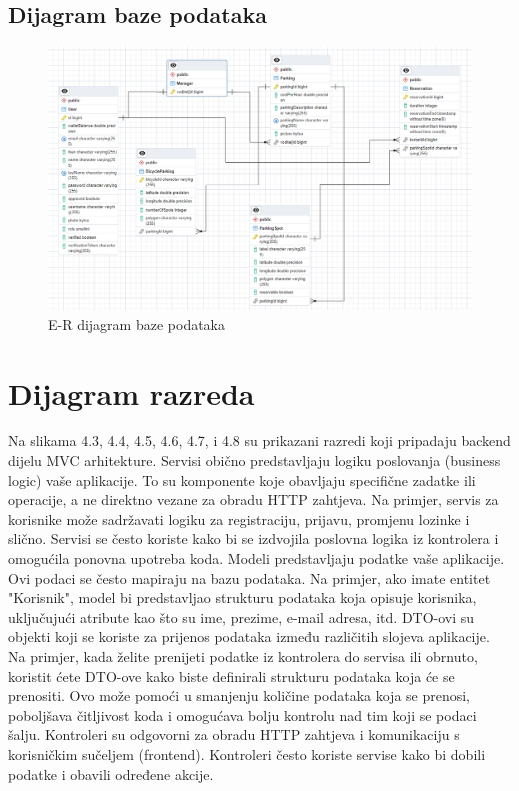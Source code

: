 \subsection{Dijagram baze podataka}


\begin{figure}[H]
	\includegraphics[width=\textwidth]{slike/baza_podataka.png} %
	\centering
	\caption{E-R dijagram baze podataka}
\end{figure}








\eject


\section{Dijagram razreda}

Na slikama 4.3, 4.4, 4.5, 4.6, 4.7, i 4.8 su prikazani razredi koji pripadaju backend dijelu MVC
arhitekture.
Servisi obično predstavljaju logiku poslovanja (business logic) vaše aplikacije. To su komponente koje obavljaju specifične zadatke ili operacije, a ne direktno vezane za obradu HTTP zahtjeva. Na primjer, servis za korisnike može sadržavati logiku za registraciju, prijavu, promjenu lozinke i slično. Servisi se često koriste kako bi se izdvojila poslovna logika iz kontrolera i omogućila ponovna upotreba koda.
Modeli predstavljaju podatke vaše aplikacije. Ovi podaci se često mapiraju na bazu podataka. Na primjer, ako imate entitet "Korisnik", model bi predstavljao strukturu podataka koja opisuje korisnika, uključujući atribute kao što su ime, prezime, e-mail adresa, itd.
DTO-ovi su objekti koji se koriste za prijenos podataka između različitih slojeva aplikacije. Na primjer, kada želite prenijeti podatke iz kontrolera do servisa ili obrnuto, koristit ćete DTO-ove kako biste definirali strukturu podataka koja će se prenositi. Ovo može pomoći u smanjenju količine podataka koja se prenosi, poboljšava čitljivost koda i omogućava bolju kontrolu nad tim koji se podaci šalju.
Kontroleri su odgovorni za obradu HTTP zahtjeva i komunikaciju s korisničkim sučeljem (frontend). Kontroleri često koriste servise kako bi dobili podatke i obavili određene akcije.


